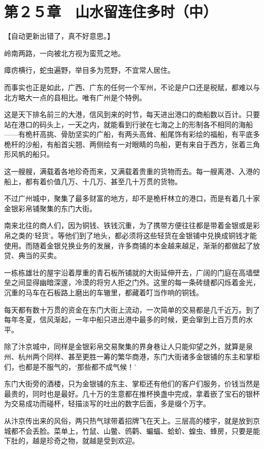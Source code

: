 \section{第２５章　山水留连住多时（中）}

【自动更新出错了，真不好意思。】

岭南两路，一向被北方视为蛮荒之地。

瘴疠横行，蛇虫遍野，举目多为荒野，不宜常人居住。

而事实也正是如此，广西、广东的任何一个军州，不论是户口还是税赋，都难以与北方略大一点的县相比。唯有广州是个特例。

这是天下排名前三的大港，信风到来的时节，每天进出港口的商船数以百计。只要站在港口的码头上，一天之内，就能看到行驶在七海之上的形制各不相同的海船——有桅杆高挑、骨肋坚实的广船，有两头高耸、船尾饰有彩绘的福船，有平底多桅杆的沙船，有船首尖翘、两侧绘有一对眼睛的鸟船，更有来自于西方，张着三角形风帆的船只。

这一艘艘，满载着各地珍奇而来，又满载着贵重的货物而去。每一艘离港、入港的船上，都有着价值几万、十几万、甚至几十万贯的货物。

不过广州城中，聚集了最多财富的地方，却不是桅杆林立的港口，而是有着几十家金银彩帛铺聚集的东门大街。

南来北往的商人们，因为铜钱、铁钱沉重，为了携带方便往往都是带着金银或是彩帛之类的‘轻货’。等他们到了地头，都必须将这些轻货在金银铺中兑换成铜钱才能使用。而随着金银兑换业务的发展，许多商铺的本金越来越足，渐渐的都做起了放贷、典当的买卖。

一栋栋雄壮的屋宇沿着厚重的青石板所铺就的大街延伸开去，广阔的门庭在高墙壁垒之间显得幽暗深邃，冷漠的将穷人拒之门外。这里的每一条砖缝都闪烁着金光，沉重的马车在石板路上磨出的车辙里，都藏着叮当作响的铜钱。

每天都有数十万贯的资金在东门大街上流动，一次简单的交易都是几千近万。到了每年冬夏，信风渐起，一年中船只进出港中最多的时候，更会窜到上百万贯的水平。

除了汴京城中，同样是金银彩帛交易聚集的界身巷让人只能仰望之外，就算是泉州、杭州两个同样、甚至更胜一筹的繁华商港，东门大街诸多金银铺的东主和掌柜们，也都是不服气的，‘那些都不成气候！’

东门大街旁的酒楼，只为金银铺的东主、掌柜还有他们的客户们服务，价钱当然是最贵的，同时也是最好。几十万的生意都在推杯换盏中完成，拿着嵌了宝石的银杯为交易成功而碰杯，轻描淡写的吐出的数字后面，多是缀个万字。

从汴京传出来的风俗，两只热气球带着招牌飞在天上。三层高的楼宇，就是放到京城都不会丢脸。菜单上，竹鼠、山鳖、鸧鹳、蝙蝠、蛤蚧、蝗虫、蜂房，只要是能下肚的，越是珍奇之物，就越是受到欢迎。

